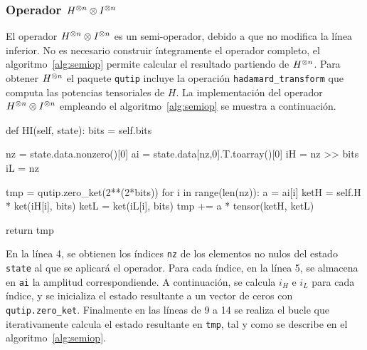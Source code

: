 \subsubsection{Operador ${H}^{\otimes n} \otimes {I}^{\otimes n} $}
El operador ${H}^{\otimes n} \otimes {I}^{\otimes n}$ es un semi-operador, debido a que no 
modifica la línea inferior. No es necesario construir íntegramente el operador 
completo, el algoritmo~\ref{alg:semiop} permite calcular el resultado partiendo 
de ${H}^{\otimes n}$.
%
Para obtener ${H}^{\otimes n}$ el paquete \texttt{qutip} incluye la operación 
\texttt{hadamard\_transform} que computa las potencias tensoriales de $H$. La 
implementación del operador ${H}^{\otimes n} \otimes {I}^{\otimes n} $ empleando el 
algoritmo~\ref{alg:semiop} se muestra a continuación.
%
\begin{pycode}
def HI(self, state):
	bits = self.bits

	nz = state.data.nonzero()[0]
	ai = state.data[nz,0].T.toarray()[0]
	iH = nz >> bits
	iL = nz %

	tmp = qutip.zero_ket(2**(2*bits))
	for i in range(len(nz)):
		a = ai[i]
		ketH = self.H * ket(iH[i], bits)
		ketL = ket(iL[i], bits)
		tmp += a * tensor(ketH, ketL)

	return tmp
\end{pycode}
%
En la línea 4, se obtienen los índices \texttt{nz} de los elementos no nulos del 
estado \texttt{state} al que se aplicará el operador. Para cada índice, en la 
línea 5, se almacena en \texttt{ai} la amplitud correspondiende. A continuación, 
se calcula $i_H$ e $i_L$ para cada índice, y se inicializa el estado resultante 
a un vector de ceros con \texttt{qutip.zero\_ket}. Finalmente en las líneas de 9 
a 14 se realiza el bucle que iterativamente calcula el estado resultante  en 
\texttt{tmp}, tal y como se describe en el algoritmo~\ref{alg:semiop}.

